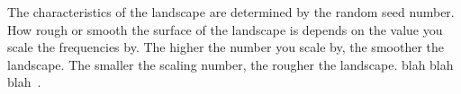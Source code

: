 \documentclass{article}
\begin{document}
	The characteristics of the landscape are determined by the random seed number. How rough or smooth the surface of the landscape is depends on the value you scale the frequencies by. The higher the number you scale by, the smoother the landscape. The smaller the scaling number, the rougher the landscape.
	    blah blah blah~\cite{Jo09, PaperII}.
     
    
    

     

    
\end{document}
